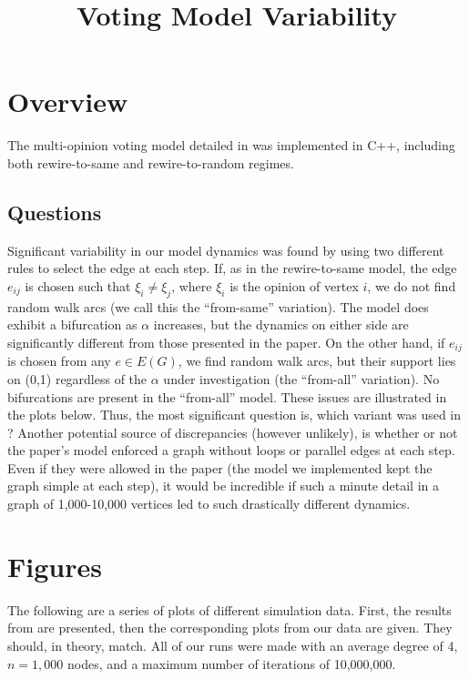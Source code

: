 \documentclass[11pt]{article}
\begin{document}
\title{Voting Model Variability}
\author{}
\date{}
\maketitle
\section*{Overview}
The multi-opinion voting model detailed in \cite{durret:pnas12} was implemented in C++, including both rewire-to-same and rewire-to-random regimes. 
\subsection*{Questions}
Significant variability in our model dynamics was found by using two different rules to select the edge at each step. If, as in the rewire-to-same model, the edge $e_{ij}$ is chosen such that $\xi_{i} \neq \xi_{j}$, where $\xi_{i}$ is the opinion of vertex $i$, we do not find random walk arcs (we call this the ``from-same'' variation). The model does exhibit a bifurcation as $\alpha$ increases, but the dynamics on either side are significantly different from those presented in the paper. On the other hand, if $e_{ij}$ is chosen from any $e \in E(G)$, we find random walk arcs, but their support lies on (0,1) regardless of the $\alpha$ under investigation (the ``from-all'' variation). No bifurcations are present in the ``from-all'' model.  These issues are illustrated in the plots below. Thus, the most significant question is, which variant was used in \cite{durret:pnas12}? Another potential source of discrepancies (however unlikely), is whether or not the paper's model enforced a graph without loops or parallel edges at each step. Even if they were allowed in the paper (the model we implemented kept the graph simple at each step), it would be incredible if such a minute detail in a graph of 1,000-10,000 vertices led to such drastically different dynamics.

\section*{Figures}
The following are a series of plots of different simulation data. First, the results from \cite{durret:pnas12} are presented, then the corresponding plots from our data are given. They should, in theory, match. All of our runs were made with an average degree of 4, $n=1,000$ nodes, and a maximum number of iterations of 10,000,000.
\end{document}
